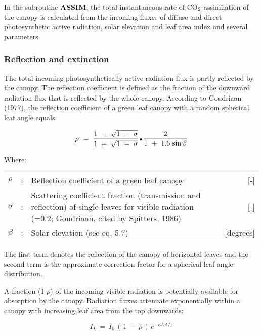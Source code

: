 In the subroutine {\bf ASSIM}, the total instantaneous rate of CO$_{{\rm 2}}$ assimilation of the canopy is
calculated from the incoming fluxes of diffuse and direct photosynthetic active radiation,
solar elevation and leaf area index and several parameters.

\subsubsection{Reflection and extinction}
The total incoming photosynthetically active radiation flux is partly reflected by the
canopy. The reflection coefficient is defined as the fraction of the downward radiation
flux that is reflected by the whole canopy. According to Goudriaan (1977), the reflection
coefficient of a green leaf canopy with a random spherical leaf angle equals:

\begin{equation}
\rho ~=~{\frac{1~-~ \sqrt{1~-~ \sigma } }{1~+~ \sqrt{1~-~ \sigma } }} \, {\rm \Bullet{0.75ex}}\,{\frac{2}{1~+~ 1.6\, \sin \beta }}
\end{equation}

Where:\\
\begin{tabularx}{\textwidth}{llXr}
$\rho$ &:& Reflection coefficient of a green leaf canopy    &    [-]\\
$\sigma$ &:& Scattering coefficient fraction (trans\-mission and reflection) 
   of single leaves for visible radiation   
   {\small (=0.2; Goudriaan, cited by Spitters, 1986)}  &     [-]\\  
$\beta$ &:& Solar elevation (see eq. 5.7)    &    [degrees]\\
\end{tabularx}
 
The first term denotes the reflection of the canopy of horizontal leaves and the second
term is the approximate correction factor for a spherical leaf angle distribu\-tion.

A fraction (1-$\rho$) of the incoming visible radiation is potentially available for absorp\-tion by
the canopy. Radiation fluxes attenuate exponentially within a canopy with increasing leaf
area from the top downwards:

\begin{equation}
I _{L~} =~ I _{0} \, (\, 1~-~\rho \, )\, e ^{- \kappa LAI _{L} }
\end{equation}

